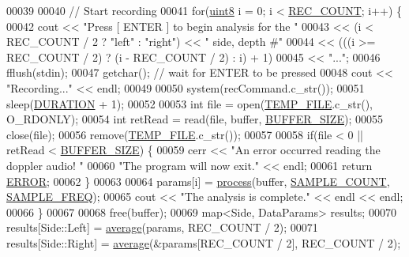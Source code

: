 \begin{DoxyCode}
00039 
00040     \textcolor{comment}{// Start recording}
00041     \textcolor{keywordflow}{for}(\hyperlink{definitions_8hpp_adde6aaee8457bee49c2a92621fe22b79}{uint8} i = 0; i < \hyperlink{definitions_8hpp_a2fd18fd694a2918f7d73eba821fd10b2}{REC\_COUNT}; i++) \{
00042         cout << \textcolor{stringliteral}{"Press [ ENTER ] to begin analysis for the "}
00043             << (i < REC\_COUNT / 2 ? \textcolor{stringliteral}{"left"} : \textcolor{stringliteral}{"right"}) << \textcolor{stringliteral}{" side, depth #"}
00044             << (((i >= REC\_COUNT / 2) ? (i - REC\_COUNT / 2) : i) + 1)
00045             << \textcolor{stringliteral}{"..."};
00046         fflush(stdin);
00047         getchar();  \textcolor{comment}{// wait for ENTER to be pressed}
00048         cout << \textcolor{stringliteral}{"Recording..."} << endl;
00049 
00050         system(recCommand.c\_str());
00051         sleep(\hyperlink{definitions_8hpp_ada7a88c013312e76596a2000cc8277fb}{DURATION} + 1);
00052 
00053         \textcolor{keywordtype}{int} file = open(\hyperlink{definitions_8hpp_a88f32e97c41b89ff0705d0a0b8566b41}{TEMP\_FILE}.c\_str(), O\_RDONLY);
00054         \textcolor{keywordtype}{int} retRead = read(file, buffer, \hyperlink{definitions_8hpp_aca681ed285767aaa2353bf3b42dd60ed}{BUFFER\_SIZE});
00055         close(file);
00056         \textcolor{keyword}{remove}(\hyperlink{definitions_8hpp_a88f32e97c41b89ff0705d0a0b8566b41}{TEMP\_FILE}.c\_str());
00057 
00058         \textcolor{keywordflow}{if}(file < 0 || retRead < \hyperlink{definitions_8hpp_aca681ed285767aaa2353bf3b42dd60ed}{BUFFER\_SIZE}) \{
00059             cerr << \textcolor{stringliteral}{"An error occurred reading the doppler audio! "}
00060                 \textcolor{stringliteral}{"The program will now exit."} << endl;
00061             \textcolor{keywordflow}{return} \hyperlink{definitions_8hpp_a876fcacb67d51738e846a3312dc08fbb}{ERROR};
00062         \}
00063 
00064         params[i] = \hyperlink{namespacevaso_a8136a2891983f7a41768330e018e3232}{process}(buffer, \hyperlink{definitions_8hpp_ad3af99f5e7cbf2af51be580e91faa934}{SAMPLE\_COUNT}, \hyperlink{definitions_8hpp_a8ace559345ecba7978591ac2ef22aea4}{SAMPLE\_FREQ});
00065         cout << \textcolor{stringliteral}{"The analysis is complete."} << endl << endl;
00066     \}
00067 
00068     free(buffer);
00069     map<Side, DataParams> results;
00070     results[Side::Left] = \hyperlink{namespacevaso_ad3205136b1cd04b4c6b9d7be73661796}{average}(params, REC\_COUNT / 2);
00071     results[Side::Right] = \hyperlink{namespacevaso_ad3205136b1cd04b4c6b9d7be73661796}{average}(&params[REC\_COUNT / 2], REC\_COUNT / 2);

\end{DoxyCode}
